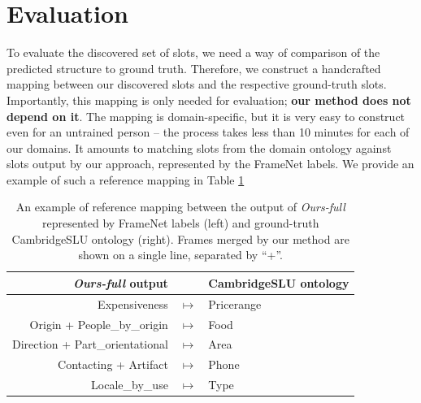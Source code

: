 \section{Evaluation}
To evaluate the discovered set of slots, we need a way of comparison of the predicted structure to ground truth.
Therefore, we construct a handcrafted mapping between our discovered slots and the respective ground-truth slots.
Importantly, this mapping is only needed for evaluation; \textbf{our method does not depend on it}.
The mapping is domain-specific, but it is very easy to construct even for an untrained person -- the process takes less than 10 minutes for each of our domains.
It amounts to matching slots from the domain ontology against slots output by our approach, represented by the FrameNet labels.
We provide an example of such a reference mapping in Table \ref{03:ref_mapping}
\label{sec:app-ref-mapping}

\begin{table}[tp]
    \centering
    \small
    \begin{tabular}{rcl}
    \textbf{\emph{Ours-full} output} & & \textbf{CambridgeSLU ontology}\\\hline
     Expensiveness & $ \mapsto$ & Pricerange\\
     Origin + People\_by\_origin & $ \mapsto$ & Food\\
     Direction + Part\_orientational & $ \mapsto$ & Area\\
     Contacting + Artifact & $ \mapsto$ & Phone\\
     Locale\_by\_use & $ \mapsto$ & Type \\
     

    \end{tabular}
    \caption{An example of reference mapping between the output of \emph{Ours-full} represented by FrameNet labels (left) and ground-truth CambridgeSLU ontology (right).
    Frames merged by our method are shown on a single line, separated by “+”.
    }
    \label{03:ref_mapping}
\end{table}

